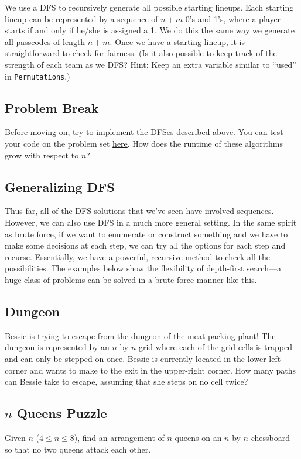 We use a DFS to recursively generate all possible starting lineups. Each starting lineup can be represented by a sequence of $n + m$ 0's and 1's, where a player starts if and only if he/she is assigned a 1. We do this the same way we generate all passcodes of length $n + m$. Once we have a starting lineup, it is straightforward to check for fairness. (Is it also possible to keep track of the strength of each team as we DFS? Hint: Keep an extra variable similar to ``used'' in \texttt{Permutations}.)

\subsection{Problem Break}

Before moving on, try to implement the DFSes described above. You can test your code on the problem set \href{http://codeforces.com}{here}. How does the runtime of these algorithms grow with respect to $n$?

\subsection{Generalizing DFS}

Thus far, all of the DFS solutions that we've seen have involved sequences. However, we can also use DFS in a much more general setting. In the same spirit as brute force, if we want to enumerate or construct something and we have to make some decisions at each step, we can try all the options for each step and recurse. Essentially, we have a powerful, recursive method to check all the possibilities. The examples below show the flexibility of depth-first search---a huge class of problems can be solved in a brute force manner like this.

\subsection{Dungeon}

\begin{typewriter}
  Bessie is trying to escape from the dungeon of the meat-packing plant! The dungeon is represented by an $n$-by-$n$ grid where each of the grid cells is trapped and can only be stepped on once. Bessie is currently located in the lower-left corner and wants to make to the exit in the upper-right corner. How many paths can Bessie take to escape, assuming that she steps on no cell twice?
\end{typewriter}

\subsection{$n$ Queens Puzzle}

\begin{typewriter}
  Given $n$ ($4 \le n \le 8$), find an arrangement of $n$ queens on an $n$-by-$n$ chessboard so that no two queens attack each other. 
\end{typewriter}

\begin{typewriter}
\end{typewriter}
